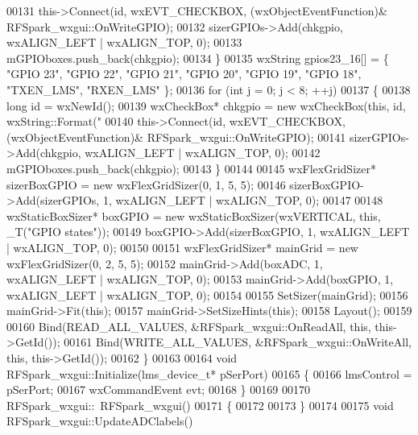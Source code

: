 \begin{DoxyCode}
{{{00131         this->Connect(\textcolor{keywordtype}{id}, wxEVT\_CHECKBOX, (wxObjectEventFunction)&
      RFSpark_wxgui::OnWriteGPIO);
00132         sizerGPIOs->Add(chkgpio, wxALIGN\_LEFT | wxALIGN\_TOP, 0);
00133         mGPIOboxes.push\_back(chkgpio);
00134     \}
00135     wxString gpios23\_16[] = \{ \textcolor{stringliteral}{"GPIO 23"}, \textcolor{stringliteral}{"GPIO 22"}, \textcolor{stringliteral}{"GPIO 21"}, \textcolor{stringliteral}{"GPIO 20"}, \textcolor{stringliteral}{"GPIO 19"}, \textcolor{stringliteral}{"GPIO 18"}, \textcolor{stringliteral}{"TXEN\_LMS"},
       \textcolor{stringliteral}{"RXEN\_LMS"} \};
00136     \textcolor{keywordflow}{for} (\textcolor{keywordtype}{int} j = 0; j < 8; ++j)
00137     \{
00138         \textcolor{keywordtype}{long} \textcolor{keywordtype}{id} = wxNewId();
00139         wxCheckBox* chkgpio = \textcolor{keyword}{new} wxCheckBox(\textcolor{keyword}{this}, \textcolor{keywordtype}{id}, wxString::Format(\textcolor{stringliteral}{"%
00140         this->Connect(\textcolor{keywordtype}{id}, wxEVT\_CHECKBOX, (wxObjectEventFunction)&
      RFSpark_wxgui::OnWriteGPIO);
00141         sizerGPIOs->Add(chkgpio, wxALIGN\_LEFT | wxALIGN\_TOP, 0);
00142         mGPIOboxes.push\_back(chkgpio);
00143     \}
00144 
00145     wxFlexGridSizer* sizerBoxGPIO = \textcolor{keyword}{new} wxFlexGridSizer(0, 1, 5, 5);
00146     sizerBoxGPIO->Add(sizerGPIOs, 1, wxALIGN\_LEFT | wxALIGN\_TOP, 0);
00147 
00148     wxStaticBoxSizer* boxGPIO = \textcolor{keyword}{new} wxStaticBoxSizer(wxVERTICAL, \textcolor{keyword}{this}, \_T(\textcolor{stringliteral}{"GPIO states"}));
00149     boxGPIO->Add(sizerBoxGPIO, 1, wxALIGN\_LEFT | wxALIGN\_TOP, 0);
00150 
00151     wxFlexGridSizer* mainGrid = \textcolor{keyword}{new} wxFlexGridSizer(0, 2, 5, 5);
00152     mainGrid->Add(boxADC, 1, wxALIGN\_LEFT | wxALIGN\_TOP, 0);
00153     mainGrid->Add(boxGPIO, 1, wxALIGN\_LEFT | wxALIGN\_TOP, 0);
00154 
00155     SetSizer(mainGrid);
00156     mainGrid->Fit(\textcolor{keyword}{this});
00157     mainGrid->SetSizeHints(\textcolor{keyword}{this});
00158     Layout();
00159 
00160     Bind(READ\_ALL\_VALUES, &RFSpark_wxgui::OnReadAll, \textcolor{keyword}{this}, this->GetId());
00161     Bind(WRITE\_ALL\_VALUES, &RFSpark_wxgui::OnWriteAll, \textcolor{keyword}{this}, this->GetId());
00162 \}
00163 
00164 \textcolor{keywordtype}{void} RFSpark_wxgui::Initialize(lms_device_t* pSerPort)
00165 \{
00166     lmsControl = pSerPort;
00167     wxCommandEvent evt;
00168 \}
00169 
00170 RFSpark_wxgui::~RFSpark_wxgui()
00171 \{
00172 
00173 \}
00174 
00175 \textcolor{keywordtype}{void} RFSpark_wxgui::UpdateADClabels()
}}}}
\end{DoxyCode}

